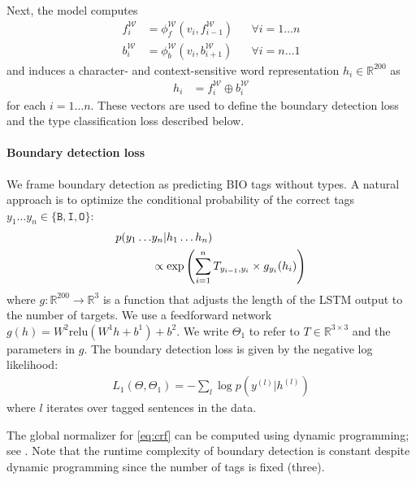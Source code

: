 \documentclass[11pt,letterpaper,UTF8]{article}
\newcommand{\R}{\ensuremath{\mathbb{R}}}
\newcommand{\ra}{\ensuremath{\rightarrow}}
\newcommand{\paren}[1]{\left(#1\right)}
\newcommand{\by}{\ensuremath{\times}}
\begin{document}
Next, the model computes
\begin{align*}
f^{\mathcal{W}}_i &= \phi^{\mathcal{W}}_f\paren{v_i, f^{\mathcal{W}}_{i-1}}  &&\forall i = 1 \ldots n \\
b^{\mathcal{W}}_i &= \phi^{\mathcal{W}}_b\paren{v_i, b^{\mathcal{W}}_{i+1}} &&\forall i = n \ldots 1
\end{align*}
and induces a character- and context-sensitive word representation $h_i \in \R^{200}$ as
\begin{align}
h_i &= f^{\mathcal{W}}_i \oplus b^{\mathcal{W}}_i \label{eq:h}
\end{align}
for each $i = 1 \ldots n$. These vectors are used to define the boundary detection loss and the type classification loss described below.

\paragraph{Boundary detection loss}
We frame boundary detection as predicting BIO tags without types.
A natural approach is to optimize the conditional probability of the correct tags
$y_1 \ldots y_n \in \{\texttt{B}, \texttt{I}, \texttt{O}\}$:
\begin{align}
  p(y_1 \ldots& y_n |  h_1 \ldots h_n) \notag\\
  &\propto \exp\paren{\sum_{i=1}^n T_{y_{i-1}, y_i} \times g_{y_i}(h_i)} \label{eq:crf}
\end{align}
where $g: \R^{200} \ra \R^3$ is a function that adjusts the length of the LSTM output to the number of targets.
We use a feedforward network $g(h) = W^2 \mbox{relu}(W^1 h + b^1) + b^2$.
We write $\Theta_1$ to refer to $T \in \R^{3 \by 3}$ and the parameters in $g$.
The boundary detection loss is given by the negative log likelihood:
\begin{align*}
L_1\paren{\Theta, \Theta_1} = - \sum_l \log p\paren{y^{(l)} | h^{(l)}}
\end{align*}
where $l$ iterates over tagged sentences in the data.

The global normalizer for \eqref{eq:crf} can be computed using dynamic programming; see .
Note that the runtime complexity of boundary detection is constant despite dynamic programming since the number of tags is fixed (three).
\end{document}
